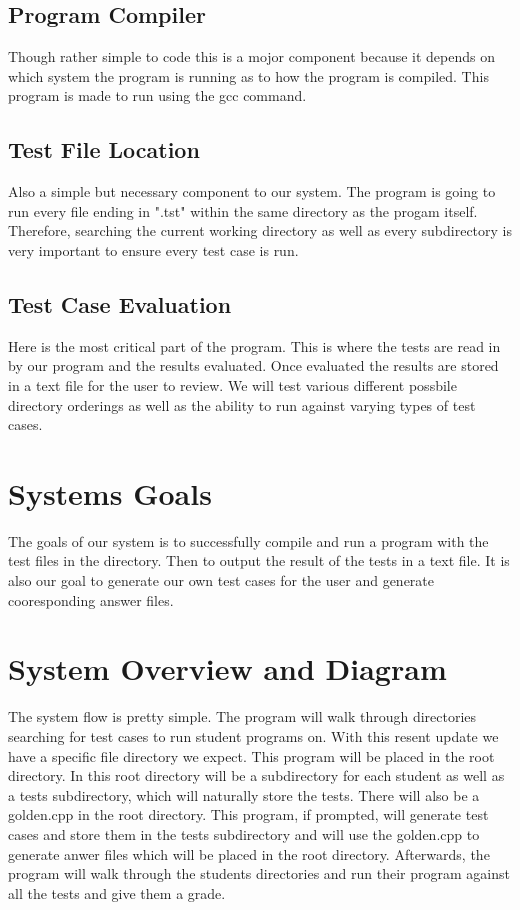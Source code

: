 \subsection{Program Compiler}
Though rather simple to code this is a mojor component because it depends on which system the program is running as to
how the program is compiled. This program is made to run using the gcc command.

\subsection{Test File Location}
Also a simple but necessary component to our system. The program is going to run every file ending in ".tst" within the same
directory as the progam itself. Therefore, searching the current working directory as well as every subdirectory is very 
important to ensure every test case is run.

\subsection{Test Case Evaluation}
Here is the most critical part of the program. This is where the tests are read in by our program and the results evaluated. 
Once evaluated the results are stored in a text file for the user to review. We will test various different possbile directory orderings as well as the ability to run against varying types of test cases.

\section{Systems Goals}
The goals of our system is to successfully compile and run a program with the test files in the directory. Then to output the result of the tests in a text file. It is also our goal to generate our own test cases for the user and generate cooresponding answer files.

\section{System Overview and Diagram}
The system flow is pretty simple. The program will walk through directories searching for test cases to run student programs on. With this resent update we have a specific file directory we expect. This program will be placed in the root directory. In this root directory will be a subdirectory for each student as well as a tests subdirectory, which will naturally store the tests. There will also be a golden.cpp in the root directory. This program, if prompted, will generate test cases and store them in the tests subdirectory and will use the golden.cpp to generate anwer files which will be placed in the root directory. Afterwards, the program will walk through the students directories and run their program against all the tests and give them a grade. 

